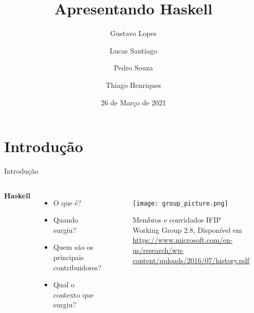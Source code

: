\documentclass[aspectratio=169]{beamer}
\title{Apresentando Haskell}
\author{Gustavo Lopes \and Lucas Santiago \and Pedro Souza \and Thiago Henriques }
\institute{Pontifícia Universidade Católica de Minas Gerais}
\date{26 de Março de 2021}
\begin{document}



    \section{Introdução}

    \begin{frame}{Introdução}
     
        \begin{columns}
          \textbf{Haskell} 
  
          \begin{itemize}
            \item O que é?
            \item Quando surgiu?
            \item Quem são os principais contribuidores?
            \item Qual o contexto que surgiu?
             
          \end{itemize}
    
  
  
          \begin{figure}  
          \texttt{[image: group\_picture.png]}
          \caption{\centering Membros e convidados IFIP Working Group 2.8, Disponível em \url{https://www.microsoft.com/en-us/research/wp-content/uploads/2016/07/history.pdf}}
          \end{figure}

        \end{columns}

    \end{frame}
\end{document}
